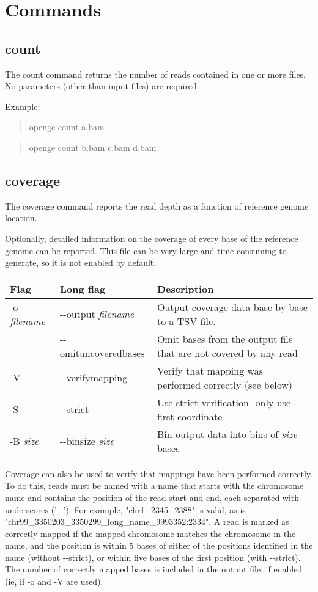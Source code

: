 \documentclass[11pt]{article}
\newcommand {\cmd}[1] {\begin{quote}#1\end{quote}}
\begin{document}
\section {Commands}

\subsection {count}
The count command returns the number of reads contained in one or more files. No parameters (other than input files) are required.

Example:
\cmd{openge count a.bam}
\cmd{openge count b.bam c.bam d.bam}

\subsection {coverage}
The coverage command reports the read depth as a function of reference genome location. 

Optionally, detailed information on the coverage of every base of the reference genome can be reported. This file can be very large and time consuming to generate, so it is not enabled by default. 

\begin{center}
\begin{tabular}{llp{3.5in}}
\hline
Flag&Long flag&Description\\ \hline
-o  \textit{filename}&{-}{-}output \textit{filename}&Output coverage data base-by-base to a TSV file.\\
&{-}{-}omituncoveredbases&Omit bases from the output file that are not covered by any read\\
-V&{-}{-}verifymapping&Verify that mapping was performed correctly (see below)\\
-S&{-}{-}strict&Use strict verification- only use first coordinate\\
-B \textit{size}&{-}{-}binsize \textit{size}&Bin output data into bins of \textit{size} bases\\
\end{tabular}
\end{center}

Coverage can also be used to verify that mappings have been performed correctly. To do this, reads must be named with a name that starts with the chromosome name and contains the position of the read start and end, each separated with underscores ('\_'). For example, "chr1\_2345\_2388" is valid, as is "chr99\_3350203\_3350299\_long\_name\_9993352:2334". A read is marked as correctly mapped if the mapped chromosome matches the chromosome in the name, and the position is within 5 bases of either of the positions identified in the name (without {-}{-}strict), or within five bases of the first position (with {-}{-}strict). The number of correctly mapped bases is included in the output file, if enabled (ie, if -o and -V are used).
\end{document}
